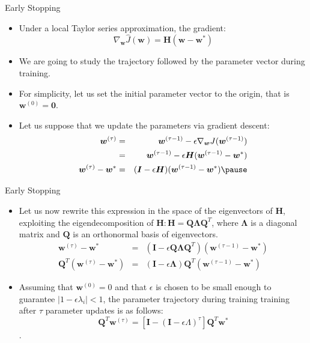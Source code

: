 \documentclass[10pt]{beamer}
\begin{document}
	\begin{frame}{Early Stopping}
		\begin{itemize}
			\item Under a local Taylor series approximation, the gradient:
			$$\nabla_{\bm{w}}\hat{J}(\bm{w})=\bm{H}(\bm{w}-\bm{w}^*)$$
			
			\pause
			\item We are going to study the trajectory followed by the parameter vector during training.
			\pause
			\item For simplicity, let us set the initial parameter vector to the origin, that is $\bm{w}^{(0)}=\bm{0}$.
			\pause
			\item Let us suppose that we update the parameters via gradient descent:
			\begin{eqnarray*}
				\bm{w}^{(\tau)}&=&\bm{w}^{(\tau-1)}-\epsilon\nabla_{\bm{w}}J(\bm{w}^{(\tau-1)})\\
				&=&\bm{w}^{(\tau-1)}-\epsilon\bm{H}(\bm{w}^{(\tau-1)}-\bm{w}^*)\\
				\bm{w}^{(\tau)}-\bm{w}^*&=&(\bm{I}-\epsilon\bm{H})(\bm{w}^{(\tau-1)}-\bm{w}^*)
				\pause
			\end{eqnarray*}
		\end{itemize}
	\end{frame}
	
	\begin{frame}{Early Stopping}
		\begin{itemize}
			\item Let us now rewrite this expression in the space of the eigenvectors of $\bm{H}$, exploiting the eigendecomposition of $\bm{H}: \bm{H}=\bm{Q\Lambda Q}^T$, where $\bm{\Lambda}$ is a diagonal matrix and $\bm{Q}$ is an orthonormal basis of eigenvectors.
			\begin{eqnarray*}
				\bm{w}^{(\tau)}-\bm{w}^*&=&(\bm{I}-\epsilon\bm{Q\Lambda Q}^T)(\bm{w}^{(\tau-1)}-\bm{w}^*)\\
				\bm{Q}^T(\bm{w}^{(\tau)}-\bm{w}^*)&=&(\bm{I}-\epsilon\bm{\Lambda})\bm{Q}^T(\bm{w}^{(\tau-1)}-\bm{w}^*)
			\end{eqnarray*}
			
			\pause
			\item Assuming that $\bm{w}^{(0)}=0$ and that $\epsilon$ is chosen to be small enough to guarantee $|1-\epsilon\lambda_i|<1$, the parameter trajectory during training training after $\tau$ parameter updates is as follows:
			$$\bm{Q}^T\bm{w}^{(\tau)}=\left[\bm{I}-(\bm{I}-\epsilon\Lambda)^{\tau}\right]\bm{Q}^T\bm{w}^*$$.
		\end{itemize}
	\end{frame}
	
\end{document}
